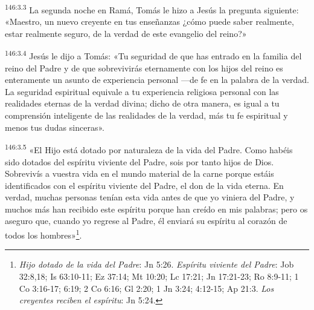 \par
\textsuperscript{146:3.3} La segunda noche en Ramá, Tomás le hizo a Jesús la pregunta siguiente: «Maestro, un nuevo creyente en tus enseñanzas ¿cómo puede saber realmente, estar realmente seguro, de la verdad de este evangelio del reino?»

\par
\textsuperscript{146:3.4} Jesús le dijo a Tomás: «Tu seguridad de que has entrado en la familia del reino del Padre y de que sobrevivirás eternamente con los hijos del reino es enteramente un asunto de experiencia personal ---de fe en la palabra de la verdad. La seguridad espiritual equivale a tu experiencia religiosa personal con las realidades eternas de la verdad divina; dicho de otra manera, es igual a tu comprensión inteligente de las realidades de la verdad, más tu fe espiritual y menos tus dudas sinceras».

\par
\textsuperscript{146:3.5} «El Hijo está dotado por naturaleza de la vida del Padre. Como habéis sido dotados del espíritu viviente del Padre, sois por tanto hijos de Dios. Sobrevivís a vuestra vida en el mundo material de la carne porque estáis identificados con el espíritu viviente del Padre, el don de la vida eterna. En verdad, muchas personas tenían esta vida antes de que yo viniera del Padre, y muchos más han recibido este espíritu porque han creído en mis palabras; pero os aseguro que, cuando yo regrese al Padre, él enviará su espíritu al corazón de todos los hombres»\footnote{\textit{Hijo dotado de la vida del Padre}: Jn 5:26. \textit{Espíritu viviente del Padre}: Job 32:8,18; Is 63:10-11; Ez 37:14; Mt 10:20; Lc 17:21; Jn 17:21-23; Ro 8:9-11; 1 Co 3:16-17; 6:19; 2 Co 6:16; Gl 2:20; 1 Jn 3:24; 4:12-15; Ap 21:3. \textit{Los creyentes reciben el espíritu}: Jn 5:24.}.

